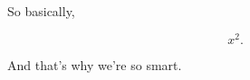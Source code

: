 \documentclass{article}
\begin{document}
  So basically,

  \begin{equation}
    x^2.
  \end{equation}

  And that's why we're so smart.
\end{document}
